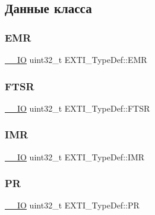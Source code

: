 \subsection{Данные класса}
\mbox{\label{struct_e_x_t_i___type_def_a9c5bff67bf9499933959df7eb91a1bd6}} 
\subsubsection{\texorpdfstring{EMR}{EMR}}
{\footnotesize\ttfamily \mbox{\hyperlink{group___c_m_s_i_s___c_m3__core__definitions_gaec43007d9998a0a0e01faede4133d6be}{\+\_\+\+\_\+\+IO}} uint32\+\_\+t E\+X\+T\+I\+\_\+\+Type\+Def\+::\+E\+MR}

\mbox{\label{struct_e_x_t_i___type_def_aee667dc148250bbf37fdc66dc4a9874d}} 
\subsubsection{\texorpdfstring{FTSR}{FTSR}}
{\footnotesize\ttfamily \mbox{\hyperlink{group___c_m_s_i_s___c_m3__core__definitions_gaec43007d9998a0a0e01faede4133d6be}{\+\_\+\+\_\+\+IO}} uint32\+\_\+t E\+X\+T\+I\+\_\+\+Type\+Def\+::\+F\+T\+SR}

\mbox{\label{struct_e_x_t_i___type_def_a17d061db586d4a5aa646b68495a8e6a4}} 
\subsubsection{\texorpdfstring{IMR}{IMR}}
{\footnotesize\ttfamily \mbox{\hyperlink{group___c_m_s_i_s___c_m3__core__definitions_gaec43007d9998a0a0e01faede4133d6be}{\+\_\+\+\_\+\+IO}} uint32\+\_\+t E\+X\+T\+I\+\_\+\+Type\+Def\+::\+I\+MR}

\mbox{\label{struct_e_x_t_i___type_def_a133294b87dbe6a01e8d9584338abc39a}} 
\subsubsection{\texorpdfstring{PR}{PR}}
{\footnotesize\ttfamily \mbox{\hyperlink{group___c_m_s_i_s___c_m3__core__definitions_gaec43007d9998a0a0e01faede4133d6be}{\+\_\+\+\_\+\+IO}} uint32\+\_\+t E\+X\+T\+I\+\_\+\+Type\+Def\+::\+PR}

